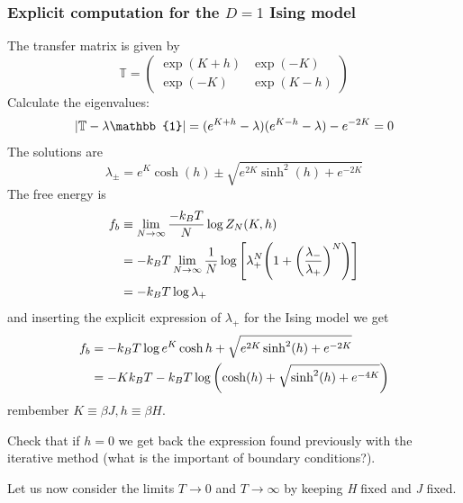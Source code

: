 \documentclass[../main/main.tex]{subfiles}
\begin{document}
\subsubsection{Explicit computation for the \( D=1 \) Ising model}
The transfer matrix is given by
\begin{equation}
  \mathbb{T} =
  \begin{pmatrix}
  \exp (K+h)     & \exp (-K)  \\
  \exp (-K)    & \exp (K-h)
  \end{pmatrix}
\end{equation}
Calculate the eigenvalues:
\begin{equation}
  \abs{\mathbb{T}-\lambda \mathbb{1}} =  (e^{K+h}- \lambda  )(e^{K-h}-\lambda  )-e^{-2K}=0
\end{equation}
The solutions are
\begin{equation}
  \lambda _{\pm} = e^{K} \cosh(h) \pm \sqrt{e^{2K}\sinh^2 (h)+e^{-2K} }
\end{equation}
The free energy is
\begin{equation}
\begin{split}
    f_b & \equiv \lim_{N \rightarrow \infty } \frac{-k_B T}{N} \log{Z_N (K,h)}   \\
    & = -k_B T \lim_{N \rightarrow \infty } \frac{1}{N}  \log{\qty[\lambda _+^N \qty(1+\qty(\frac{\lambda _-}{\lambda _+})^N ) ] } \\
    & = -k_B T \log{\lambda _+}
\end{split}
\end{equation}
and inserting the explicit expression of \( \lambda _+ \) for the Ising model we get
\begin{equation}
\begin{split}
f_b  &=  -k_B T \log{e^{K} \cosh h + \sqrt{e^{2K} \sinh^2 (h) + e^{-2K}  }  } \\
& = -K k_B T - k_B T \log{\qty( \cosh(h)+\sqrt{\sinh^2(h)+e^{-4K}  } )}
\end{split}
\end{equation}
rembember \( K \equiv \beta J, h \equiv \beta H\).
\begin{exercise}
Check that if \( h=0 \) we get back the expression found previously with the iterative method (what is the important of boundary conditions?).
\end{exercise}
Let us now consider the limits \( T \rightarrow 0 \) and \( T \rightarrow \infty  \) by keeping \emph{H} fixed and \emph{J} fixed.
\end{document}
